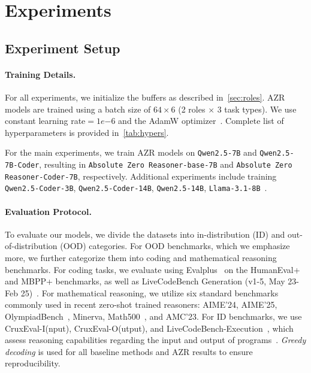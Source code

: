 \documentclass{article}
\begin{document}
\section{Experiments}
\subsection{Experiment Setup}
\paragraph{Training Details.}
For all experiments, we initialize the buffers as described in~\cref{sec:roles}. AZR models are trained using a batch size of \(64 \times 6\) (2 roles \(\times\) 3 task types). We use constant learning rate\(=1e{-6}\) and the AdamW optimizer~\citep{loshchilov2017decoupled}. Complete list of hyperparameters is provided in~\cref{tab:hypers}.

For the main experiments, we train AZR models on \texttt{Qwen2.5-7B} and \texttt{Qwen2.5-7B-Coder}, resulting in \texttt{Absolute Zero Reasoner-base-7B} and \texttt{Absolute Zero Reasoner-Coder-7B}, respectively. Additional experiments include training \texttt{Qwen2.5-Coder-3B}, \texttt{Qwen2.5-Coder-14B}, \texttt{Qwen2.5-14B}, \texttt{Llama-3.1-8B}~\citep{yang2024qwen2,DBLP:journals/corr/abs-2409-12186,grattafiori2024llama3herdmodels}.

\paragraph{Evaluation Protocol.}
To evaluate our models, we divide the datasets into in-distribution (ID) and out-of-distribution (OOD) categories. For OOD benchmarks, which we emphasize more, we further categorize them into coding and mathematical reasoning benchmarks. For coding tasks, we evaluate using Evalplus~\citep{evalplus} on the HumanEval+ and MBPP+ benchmarks, as well as LiveCodeBench Generation (v1-5, May 23-Feb 25)~\citep{jain2024livecodebench}. For mathematical reasoning, we utilize six standard benchmarks commonly used in recent zero-shot trained reasoners: AIME'24, AIME'25, OlympiadBench~\citep{He2024OlympiadBenchAC}, Minerva, Math500~\citep{hendrycks2021measuringmathematicalproblemsolving}, and AMC'23. For ID benchmarks, we use CruxEval-I(nput), CruxEval-O(utput), and LiveCodeBench-Execution~\citep{gu2024cruxeval,jain2024livecodebench}, which assess reasoning capabilities regarding the input and output of programs~\citep{li2025codei}. \emph{Greedy decoding} is used for all baseline methods and AZR results to ensure reproducibility.
\end{document}
